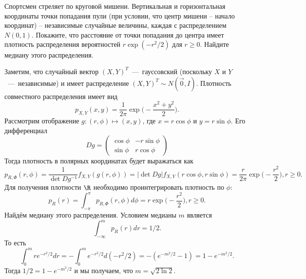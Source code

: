 \begin{problem}[99]
    Спортсмен стреляет по круговой мишени.
    Вертикальная и горизонтальная координаты точки попадания пули (при условии, что центр мишени -- начало координат) -- независимые случайные величины, каждая с распределением $N(0, 1)$.
    Покажите, что расстояние от точки попадания до центра имеет плотность распределения вероятностей $r \exp(-r^2/2)$ для $r \geq 0$.
    Найдите медиану этого распределения.
\end{problem}
\begin{solution}
    Заметим, что случайный вектор $(X, Y)^T$~---~гауссовский (поскольку $X$ и $Y$~---~независимые) и имеет распределение $(X, Y)^T \sim N(\vec{0}, I)$.
    Плотность совместного распределения имеет вид
    \[
        p_{X, Y}(x, y) = \dfrac{1}{2\pi}\exp\biggr(-\dfrac{x^2 + y^2}{2}\biggr).
    \]
    Рассмотрим отображение $g: (r, \phi) \mapsto (x, y)$, где $x = r\cos\phi$ и $y = r\sin\phi$.
    Его дифференциал
    \[
        Dg =
        \begin{pmatrix*}
            \cos\phi & -r\sin\phi \\ \sin\phi & r\cos\phi
        \end{pmatrix*}
    \]
    Тогда плотность в полярных координатах будет выражаться как
    \[
        p_{R, \Phi}(r, \phi) = \dfrac{1}{\det Dg^{-1}}f_{X, Y}(g(r, \phi)) = |\det Dg|f_{X, Y}(r\cos\phi, r\sin\phi) = \dfrac{r}{2\pi}\exp\biggr(-\dfrac{r^2}{2}\biggr), r \geq 0.
    \]
    Для получения плотности $\R$ необходимо проинтегрировать плотность по $\phi$:
    \[
        p_{R}(r) = \int_{-\pi}^\pi p_{R, \Phi}(r, \phi)d\phi = r\exp\biggr(-\dfrac{r^2}{2}\biggr), r \geq 0.
    \]
    Найдём медиану этого распределения. Условием медианы $m$ является
    \[
        \int_{-\infty}^m p_R(r)dr = 1/2.
    \]
    То есть
    \[
        \int_0^m re^{-r^2/2}dr = -\int_0^m e^{-r^2/2}d(-r^2/2) = -(e^{-m^2/2} - 1) = 1 - e^{-m^2/2}.
    \]
    Тогда $1/2 = 1 - e^{-m^2/2}$ и мы получаем, что $m = \sqrt{2\ln 2}$.
\end{solution}